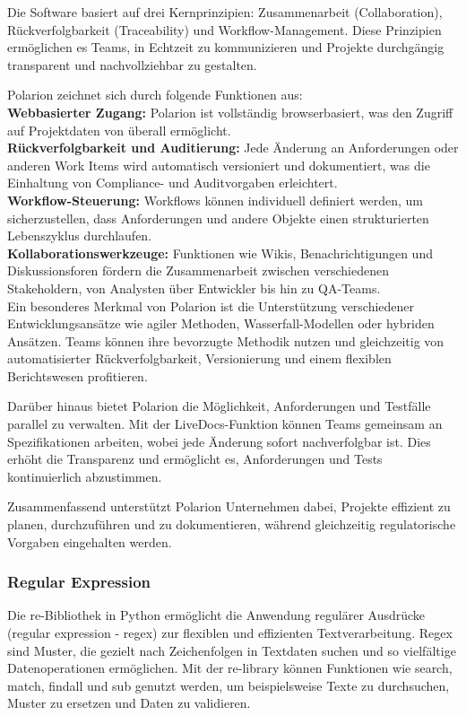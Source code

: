 \documentclass[a4paper, 12pt]{article}
\begin{document}
Die Software basiert auf drei Kernprinzipien: Zusammenarbeit (Collaboration), Rückverfolgbarkeit (Traceability) und Workflow-Management. Diese Prinzipien ermöglichen es Teams, in Echtzeit zu kommunizieren und Projekte durchgängig transparent und nachvollziehbar zu gestalten.

Polarion zeichnet sich durch folgende Funktionen aus:\\
\textbf{Webbasierter Zugang:} Polarion ist vollständig browserbasiert, was den Zugriff auf Projektdaten von überall ermöglicht.\\
\textbf{Rückverfolgbarkeit und Auditierung:} Jede Änderung an Anforderungen oder anderen Work Items wird automatisch versioniert und dokumentiert, was die Einhaltung von Compliance- und Auditvorgaben erleichtert.\\
\textbf{Workflow-Steuerung:} Workflows können individuell definiert werden, um sicherzustellen, dass Anforderungen und andere Objekte einen strukturierten Lebenszyklus durchlaufen.\\
\textbf{Kollaborationswerkzeuge:} Funktionen wie Wikis, Benachrichtigungen und Diskussionsforen fördern die Zusammenarbeit zwischen verschiedenen Stakeholdern, von Analysten über Entwickler bis hin zu QA-Teams.\\
Ein besonderes Merkmal von Polarion ist die Unterstützung verschiedener Entwicklungsansätze wie agiler Methoden, Wasserfall-Modellen oder hybriden Ansätzen. Teams können ihre bevorzugte Methodik nutzen und gleichzeitig von automatisierter Rückverfolgbarkeit, Versionierung und einem flexiblen Berichtswesen profitieren.

Darüber hinaus bietet Polarion die Möglichkeit, Anforderungen und Testfälle parallel zu verwalten. Mit der LiveDocs-Funktion können Teams gemeinsam an Spezifikationen arbeiten, wobei jede Änderung sofort nachverfolgbar ist. Dies erhöht die Transparenz und ermöglicht es, Anforderungen und Tests kontinuierlich abzustimmen.

Zusammenfassend unterstützt Polarion Unternehmen dabei, Projekte effizient zu planen, durchzuführen und zu dokumentieren, während gleichzeitig regulatorische Vorgaben eingehalten werden. \cite{polarion_web}


\subsubsection{Regular Expression}\label{regularExpression}
Die re-Bibliothek in Python ermöglicht die Anwendung regulärer Ausdrücke (regular expression - regex) zur flexiblen und effizienten Textverarbeitung. Regex sind Muster, die gezielt nach Zeichenfolgen in Textdaten suchen und so vielfältige Datenoperationen ermöglichen. Mit der re-library können Funktionen wie search, match, findall und sub genutzt werden, um beispielsweise Texte zu durchsuchen, Muster zu ersetzen und Daten zu validieren. \cite{regex_lib}
\end{document}
